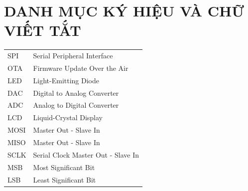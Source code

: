\tableofcontents 
    \thispagestyle{empty}
        \newpage

\section*{DANH MỤC KÝ HIỆU VÀ CHỮ VIẾT TẮT}
     {}

\begin{tabular}{ l l }
    \hspace{1cm} SPI & \hspace{4cm} Serial Peripheral Interface \\  
    \hspace{1cm} OTA & \hspace{4cm} Firmware Update Over the Air    \\
    \hspace{1cm} LED  & \hspace{4cm} Light-Emitting Diode \\
    \hspace{1cm} DAC  & \hspace{4cm} Digital to Analog Converter \\
    \hspace{1cm} ADC  & \hspace{4cm} Analog to Digital Converter \\
    \hspace{1cm} LCD  & \hspace{4cm} Liquid-Crystal Display \\
    \hspace{1cm} MOSI & \hspace{4cm} Master Out - Slave In \\
    \hspace{1cm} MISO & \hspace{4cm} Master Out - Slave In \\
    \hspace{1cm} SCLK & \hspace{4cm} Serial Clock Master Out - Slave In \\
    \hspace{1cm} MSB  & \hspace{4cm} Most Significant Bit \\
    \hspace{1cm} LSB  & \hspace{4cm} Least Significant Bit \\

\end{tabular}
